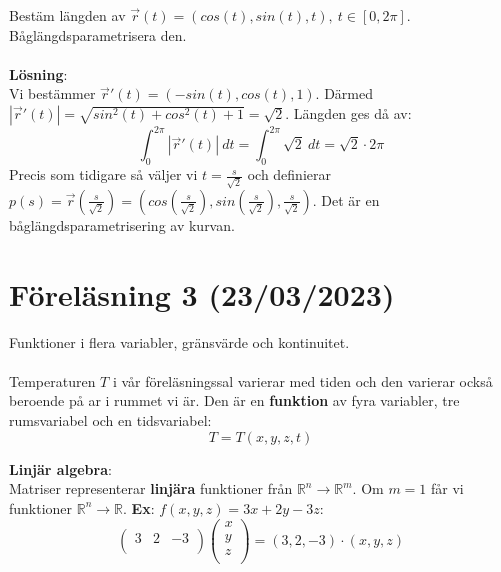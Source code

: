\documentclass{report}
\begin{document}
\ex{}
{
Bestäm längden av $ \vec{r} (t) = ( cos(t), sin(t), t ), \: t \in [0,2\pi] $. Båglängdsparametrisera den.\\\\

\textbf{Lösning}:\\
Vi bestämmer $ \vec{r} ' (t) = (-sin(t), cos(t), 1) $. Därmed $ |\vec{r} '(t)|  = \sqrt{sin^2(t) + cos^2(t) + 1} = \sqrt{2}  $. Längden ges då av:
\begin{equation*}
\int_{0}^{ 2 \pi} | \vec{r} '(t)| \: dt = \int_{0}^{ 2 \pi} \sqrt{2}  \: dt = \sqrt{2} \cdot 2\pi   
\end{equation*}
Precis som tidigare så väljer vi $ t = \frac{s}{ \sqrt{2} }  $ och definierar $ p(s) = \vec{r} ( \frac{s}{ \sqrt{2} } ) = ( cos( \frac{s}{ \sqrt{2} } ), sin( \frac{s}{ \sqrt{2} }  ), \frac{s}{ \sqrt{2} }  ) $. Det är en båglängdsparametrisering av kurvan. 
}

\pagebreak

\section{Föreläsning 3 (23/03/2023)}
Funktioner i flera variabler, gränsvärde och kontinuitet.\\\\

\ex{}
{
Temperaturen $ T $ i vår föreläsningssal varierar med tiden och den varierar också beroende på ar i rummet vi är. Den är en \textbf{funktion} av fyra variabler, tre rumsvariabel och en tidsvariabel:
\begin{equation*}
T = T(x,y,z,t)
\end{equation*}
}

\textbf{Linjär algebra}:\\
Matriser representerar \textbf{linjära} funktioner från $ \mathbb{R}^n \to \mathbb{R}^m $. Om $ m = 1 $ får vi funktioner $ \mathbb{R}^n \to \mathbb{R}	 $. \textbf{Ex}: $ f(x,y,z) = 3x+2y-3z $:
\begin{equation*}
\begin{pmatrix}
	3 & 2 & -3 \\
\end{pmatrix}
\begin{pmatrix}
	x \\
	y \\
	z \\
\end{pmatrix}
= (3,2,-3) \cdot (x,y,z)
\end{equation*} 
\end{document}
